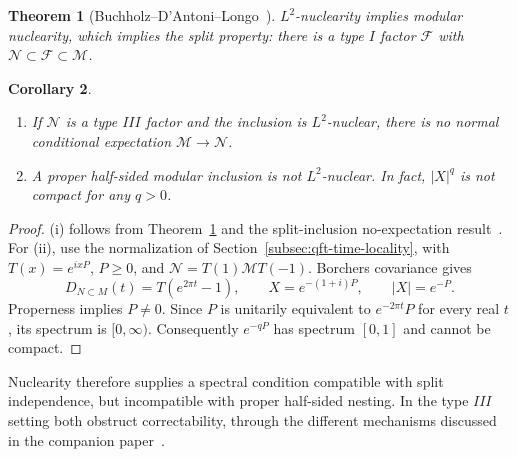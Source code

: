 \documentclass[a4paper,11pt]{article}
\newtheorem{theorem}{Theorem}
\newtheorem{corollary}[theorem]{Corollary}
\theoremstyle{definition}
\begin{document}
\begin{theorem}[Buchholz--D'Antoni--Longo~\cite{BDL1990,BDL2007}]\label{thm:BDL}
$L^2$-nuclearity implies modular nuclearity, which implies the split property: there is a type $I$ factor $\mathcal F$ with $\mathcal N\subset\mathcal F\subset\mathcal M$.
\end{theorem}

\begin{corollary}\label{cor:nuclear-position}
\begin{enumerate}
 \item[\rm(i)] If $\mathcal N$ is a type $III$ factor and the inclusion is $L^2$-nuclear, there is no normal conditional expectation $\mathcal M\to\mathcal N$.
 \item[\rm(ii)] A proper half-sided modular inclusion is not $L^2$-nuclear. In fact, $|X|^q$ is not compact for any $q>0$.
\end{enumerate}
\end{corollary}
\begin{proof}
(i) follows from Theorem~\ref{thm:BDL} and the split-inclusion no-expectation result~\cite{companionQEC}. For (ii), use the normalization of Section~\ref{subsec:qft-time-locality}, with $T(x)=e^{ixP}$, $P\ge0$, and $\mathcal N=T(1)\mathcal M T(-1)$. Borchers covariance gives
\begin{equation}
 D_{N\subset M}(t)=T(e^{2\pi t}-1),
 \qquad X=e^{-(1+i)P},\qquad |X|=e^{-P}.
 \label{eq:inclusion-HSMI-X}
\end{equation}
Properness implies $P\ne0$. Since $P$ is unitarily equivalent to $e^{-2\pi t}P$ for every real $t$, its spectrum is $[0,\infty)$. Consequently $e^{-qP}$ has spectrum $[0,1]$ and cannot be compact.
\end{proof}

Nuclearity therefore supplies a spectral condition compatible with split independence, but incompatible with proper half-sided nesting. In the type $III$ setting both obstruct correctability, through the different mechanisms discussed in the companion paper~\cite{companionQEC}.
\end{document}
